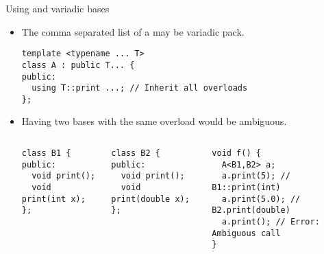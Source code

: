 \begin{frame}[t,fragile]{Using and variadic bases}
\begin{itemize}
  \item The comma separated list of a 
        may be variadic pack.
\begin{lstlisting}
template <typename ... T>
class A : public T... {
public:
  using T::print ...; // Inherit all overloads
};
\end{lstlisting}

  \item Having two bases with the same overload would be ambiguous.

\begin{columns}[T]

\begin{lstlisting}
class B1 {
public:
  void print();
  void print(int x);
};
\end{lstlisting}
\begin{lstlisting}
class B2 {
public:
  void print();
  void print(double x);
};
\end{lstlisting}
\begin{lstlisting}
void f() {
  A<B1,B2> a;
  a.print(5); // B1::print(int)
  a.print(5.0); // B2.print(double)
  a.print(); // Error: Ambiguous call
}
\end{lstlisting}
\end{columns}
\end{itemize}
\end{frame}

